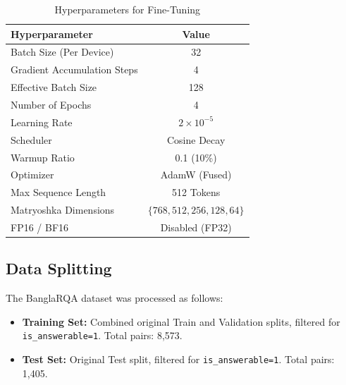\documentclass[acmsmall,screen,review]{acmart}
\begin{document}
\begin{table}[h]
    \caption{Hyperparameters for Fine-Tuning}
    \label{tab:hyperparameters}
    \centering
    \begin{tabular}{lc}
        \toprule
        \textbf{Hyperparameter} & \textbf{Value} \\
        \midrule
        Batch Size (Per Device) & 32 \\
        Gradient Accumulation Steps & 4 \\
        Effective Batch Size & 128 \\
        Number of Epochs & 4 \\
        Learning Rate & $2 \times 10^{-5}$ \\
        Scheduler & Cosine Decay \\
        Warmup Ratio & 0.1 (10\%) \\
        Optimizer & AdamW (Fused) \\
        Max Sequence Length & 512 Tokens \\
        Matryoshka Dimensions & $\{768, 512, 256, 128, 64\}$ \\
        FP16 / BF16 & Disabled (FP32) \\
        \bottomrule
    \end{tabular}
\end{table}

\subsection{Data Splitting}
The BanglaRQA dataset was processed as follows:
\begin{itemize}
    \item \textbf{Training Set:} Combined original Train and Validation splits, filtered for \texttt{is\_answerable=1}. Total pairs: 8,573.
    \item \textbf{Test Set:} Original Test split, filtered for \texttt{is\_answerable=1}. Total pairs: 1,405.
\end{itemize}
\end{document}
